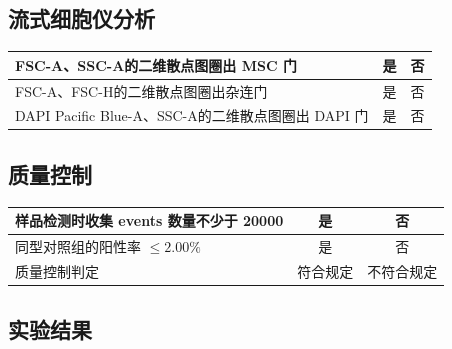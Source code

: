 \documentclass[UTF8,10pt,a4paper,fontset=fandol]{ctexart}
\newcommand{\fieldvalue}[1]{#1}
\newcommand{\handwritten}[1]{#1}
\begin{document}
\subsection*{流式细胞仪分析}

\begin{tabularx}{\textwidth}{|X|c|c|}
\hline
FSC-A、SSC-A的二维散点图圈出 MSC 门 &
\fieldvalue{\handwritten{是}} & 否 \\
\hline
FSC-A、FSC-H的二维散点图圈出杂连门 &
\fieldvalue{\handwritten{是}} & 否 \\
\hline
DAPI Pacific Blue-A、SSC-A的二维散点图圈出 DAPI 门 &
\fieldvalue{\handwritten{是}} & 否 \\
\hline
\end{tabularx}

\subsection*{质量控制}

\begin{tabularx}{\textwidth}{|X|c|c|}
\hline
样品检测时收集 events 数量不少于 20000 &
\fieldvalue{\handwritten{是}} & 否 \\
\hline
同型对照组的阳性率 $\leq 2.00\%$ &
\fieldvalue{\handwritten{是}} & 否 \\
\hline
质量控制判定 &
\fieldvalue{\handwritten{符合规定}} & 不符合规定 \\
\hline
\end{tabularx}

\subsection*{实验结果}
\end{document}
